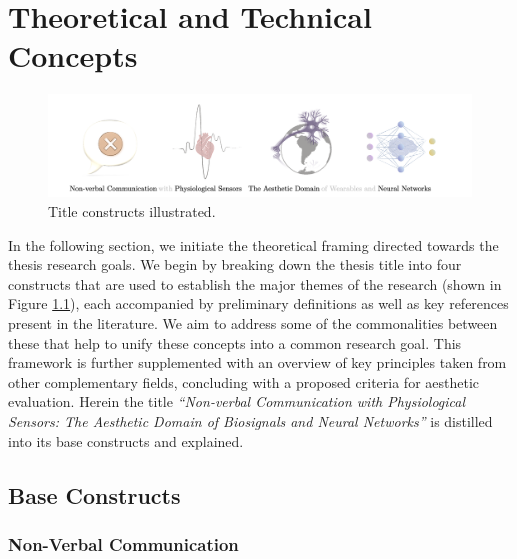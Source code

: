 

\chapter{Theoretical and Technical Concepts}
\label{cha:technical_concepts}

\begin{figure}[htbp]
	\centering
	\includegraphics[width=\textwidth]{Chapters/Figures/background/sec2_title_constructs_alpha_2.png}
	\caption{Title constructs illustrated.}
	\label{fig:title_constructs}
\end{figure}

In the following section, we initiate the theoretical framing directed towards the thesis research goals. We begin by breaking down the thesis title into four constructs that are used to establish the major themes of the research (shown in Figure \ref{fig:title_constructs}), each accompanied by preliminary definitions as well as key references present in the literature. We aim to address some of the commonalities between these that help to unify these concepts into a common research goal. This framework is further supplemented with an overview of key principles taken from other complementary fields, concluding with a proposed criteria for aesthetic evaluation. Herein the title \textit{``Non-verbal Communication with Physiological Sensors: The Aesthetic Domain of Biosignals and Neural Networks''} is distilled into its base constructs and explained.

\section{Base Constructs}
\label{sec:title_constructs}

\subsection*{Non-Verbal Communication}

